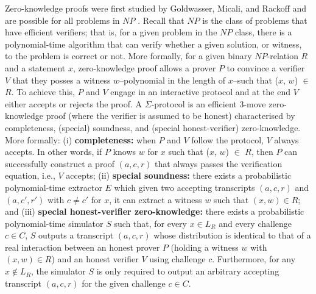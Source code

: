 \documentclass[sigconf,anonymous,review]{acmart}
\begin{document}
Zero-knowledge proofs were first studied by Goldwasser, Micali, and Rackoff \cite{10.1145/22145.22178} and 
are possible for all problems in $NP$ \cite{10.1145/116825.116852}. Recall that $NP$ is the class of 
problems that have efficient verifiers; that is, for a given problem in the $NP$ class, there is 
a polynomial-time algorithm that can verify whether a given solution, or witness, to the problem is correct or not.
More formally, for a given binary $NP$-relation $R$ and a statement $x$, zero-knowledge proof allows a prover 
$P$ to convince a verifier $V$ that they posses a witness $w$--polynomial in the length of $x$--such 
that ($x$, $w$) $\in$ $R$. To achieve this, $P$ and $V$ engage in an 
interactive protocol and at the end $V$ either accepts or rejects the proof.
A $\Sigma$-protocol is an efficient 3-move zero-knowledge proof (where the 
verifier is assumed to be honest) characterised by completeness, (special) soundness, and 
(special honest-verifier) zero-knowledge. More formally: (i) \textbf{completeness:}
  when $P$ and $V$ follow the protocol, $V$ always accepts. 
  In other words, if $P$ knows $w$ for $x$ such that ($x$, $w$) $\in$ $R$,  
  then $P$ can successfully construct a proof $(a, c, r)$ that always passes the verification equation, 
  i.e., $V$ accepts; (ii) \textbf{special soundness:}
there exists a probabilistic polynomial-time extractor $E$ which given 
two accepting transcripts $(a, c, r)$ and $(a, c', r')$ with $c\neq c'$ for $x$, 
it can extract a witness $w$ such that $(x, w) \in R$; and (iii) \textbf{special honest-verifier zero-knowledge:}
there exists a probabilistic polynomial-time simulator \(S\) such that, for every \(x \in L_R\) and every challenge \(c \in C\), \(S\) outputs a transcript \((a,c,r)\) whose distribution is identical to that of a real interaction between an honest prover \(P\) (holding a witness \(w\) with \((x,w)\in R\)) and an honest verifier \(V\) using challenge $c$. Furthermore, for any \(x \notin L_R\), the simulator \(S\) is only required to output an arbitrary accepting transcript \((a,c,r)\) for the given challenge \(c \in C\).
\end{document}
